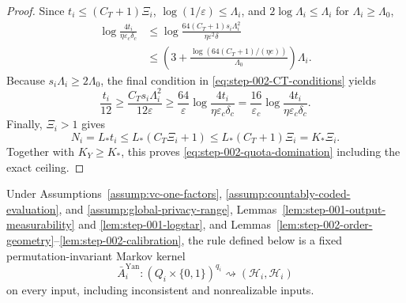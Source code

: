 \begin{proof}
Since \(t_i\le(C_T+1)\Xi_i\),
\(\log(1/\varepsilon)\le\Lambda_i\), and
\(2\log\Lambda_i\le\Lambda_i\) for \(\Lambda_i\ge\Lambda_0\),
\begin{equation}\label{eq:step-002-choosing-log}
\begin{split}
\log\frac{4t_i}{\eta\varepsilon_c\delta_c}
&\le\log\frac{64(C_T+1)s_i\Lambda_i^2}
                 {\eta\varepsilon^2\delta}\\
&\le\left(3+
\frac{\log(64(C_T+1)/(\eta e))}{\Lambda_0}\right)\Lambda_i.
\end{split}
\end{equation}
Because \(s_i\Lambda_i\ge2\Lambda_0\), the final condition in
\eqref{eq:step-002-CT-conditions} yields
\[
\frac{t_i}{12}
\ge\frac{C_Ts_i\Lambda_i^2}{12\varepsilon}
\ge\frac{64}{\varepsilon}
\log\frac{4t_i}{\eta\varepsilon_c\delta_c}
=\frac{16}{\varepsilon_c}
\log\frac{4t_i}{\eta\varepsilon_c\delta_c}.
\]
Finally, \(\Xi_i>1\) gives
\begin{equation}\label{eq:step-002-internal-size}
N_i=L_*t_i\le L_*(C_T\Xi_i+1)
\le L_*(C_T+1)\Xi_i=K_*\Xi_i.
\end{equation}
Together with \(K_Y\ge K_*\), this proves
\eqref{eq:step-002-quota-domination} including the exact ceiling.
\end{proof}

\begin{proposition}
\label{prop:step-002-kernel}
Under Assumptions~\ref{assump:vc-one-factors},
\ref{assump:countably-coded-evaluation}, and
\ref{assump:global-privacy-range}, Lemmas~\ref{lem:step-001-output-measurability}
and \ref{lem:step-001-logstar}, and
Lemmas~\ref{lem:step-002-order-geometry}--\ref{lem:step-002-calibration},
the rule defined below is a fixed permutation-invariant Markov kernel
\[
\bar A_i^{\mathrm{Yan}}:
(Q_i\times\{0,1\})^{q_i}\rightsquigarrow
(\mathcal H_i,\mathscr H_i)
\]
on every input, including inconsistent and nonrealizable inputs.
\end{proposition}

